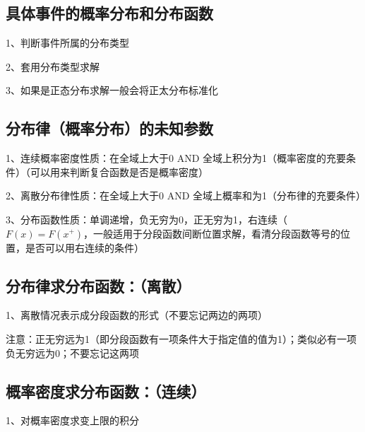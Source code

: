 \subsection{具体事件的概率分布和分布函数}

1、判断事件所属的分布类型

2、套用分布类型求解

3、如果是正态分布求解一般会将正太分布标准化



\subsection{分布律（概率分布）的未知参数}

1、连续概率密度性质：在全域上大于0 AND 全域上积分为1（概率密度的充要条件）（可以用来判断复合函数是否是概率密度）

2、离散分布律性质：在全域上大于0 AND 全域上概率和为1（分布律的充要条件）

3、分布函数性质：单调递增，负无穷为0，正无穷为1，右连续（$F(x)=F(x^+)$，一般适用于分段函数间断位置求解，看清分段函数等号的位置，是否可以用右连续的条件）



\subsection{分布律求分布函数：（离散）}

1、离散情况表示成分段函数的形式（不要忘记两边的两项）

注意：正无穷远为1（即分段函数有一项条件大于指定值的值为1）；类似必有一项负无穷远为0；不要忘记这两项



\subsection{概率密度求分布函数：（连续）}

1、对概率密度求变上限的积分

